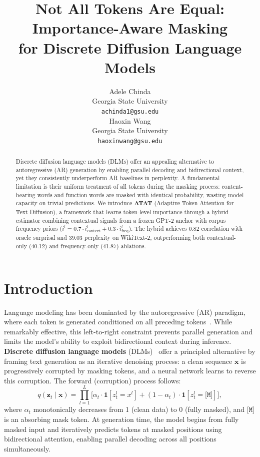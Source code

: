 \documentclass[11pt]{article}
\title{Not All Tokens Are Equal: Importance-Aware Masking\\for Discrete Diffusion Language Models}
\author{Adele Chinda \\
  Georgia State University \\
  \texttt{achinda1@gsu.edu} \\\And
  Haoxin Wang \\
  Georgia State University \\
  \texttt{haoxinwang@gsu.edu} \\}
\newcommand{\rvx}{\mathbf{x}}
\newcommand{\rvz}{\mathbf{z}}
\newcommand{\ind}{\mathbf{1}}
\theoremstyle{remark}
\begin{document}
\maketitle

\begin{abstract}
Discrete diffusion language models (DLMs) offer an appealing alternative to autoregressive (AR) generation by enabling parallel decoding and bidirectional context, yet they consistently underperform AR baselines in perplexity.
A fundamental limitation is their uniform treatment of all tokens during the masking process: content-bearing words and function words are masked with identical probability, wasting model capacity on trivial predictions.
We introduce \textbf{ATAT} (Adaptive Token Attention for Text Diffusion), a framework that learns token-level importance through a hybrid estimator combining contextual signals from a frozen GPT-2 anchor with corpus frequency priors ($i^l = 0.7 \cdot i^l_{\text{context}} + 0.3 \cdot i^l_{\text{freq}}$).
The hybrid achieves 0.82 correlation with oracle surprisal and 39.03 perplexity on WikiText-2, outperforming both contextual-only (40.12) and frequency-only (41.87) ablations.
\end{abstract}

\section{Introduction}
\label{sec:intro}

Language modeling has been dominated by the autoregressive (AR) paradigm, where each token is generated conditioned on all preceding tokens~\citep{gpt2,gpt3,llama,llama2}. While remarkably effective, this left-to-right constraint prevents parallel generation and limits the model's ability to exploit bidirectional context during inference. \textbf{Discrete diffusion language models} (DLMs)~\citep{d3pm,mdlm,sedd} offer a principled alternative by framing text generation as an iterative denoising process: a clean sequence $\rvx$ is progressively corrupted by masking tokens, and a neural network learns to reverse this corruption. The forward (corruption) process follows:
\begin{equation}
    q(\rvz_t \mid \rvx) = \prod_{l=1}^{L} \bigl[\alpha_t \cdot \ind[z_t^l = x^l] + (1{-}\alpha_t) \cdot \ind[z_t^l = \texttt{[M]}]\bigr],
    \label{eq:forward}
\end{equation}
where $\alpha_t$ monotonically decreases from 1 (clean data) to 0 (fully masked), and $\texttt{[M]}$ is an absorbing mask token. At generation time, the model begins from fully masked input and iteratively predicts tokens at masked positions using bidirectional attention, enabling parallel decoding across all positions simultaneously.
\end{document}
